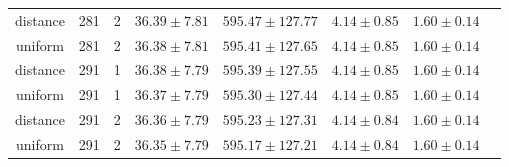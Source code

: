 \begin{tabular}{cccrrrrr}
distance & 281 & 2 & $36.39 \pm 7.81$ & $595.47 \pm 127.77$ & $4.14 \pm 0.85$ & $1.60 \pm 0.14$\\
uniform & 281 & 2 & $36.38 \pm 7.81$ & $595.41 \pm 127.65$ & $4.14 \pm 0.85$ & $1.60 \pm 0.14$\\
distance & 291 & 1 & $36.38 \pm 7.79$ & $595.39 \pm 127.55$ & $4.14 \pm 0.85$ & $1.60 \pm 0.14$\\
uniform & 291 & 1 & $36.37 \pm 7.79$ & $595.30 \pm 127.44$ & $4.14 \pm 0.85$ & $1.60 \pm 0.14$\\
distance & 291 & 2 & $36.36 \pm 7.79$ & $595.23 \pm 127.31$ & $4.14 \pm 0.84$ & $1.60 \pm 0.14$\\
uniform & 291 & 2 & $36.35 \pm 7.79$ & $595.17 \pm 127.21$ & $4.14 \pm 0.84$ & $1.60 \pm 0.14$\\
\bottomrule
\end{tabular}
